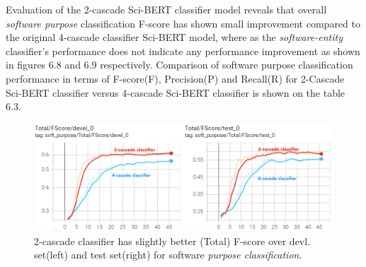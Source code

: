 Evaluation of the 2-cascade Sci-BERT classifier model reveals that overall \emph{software purpose} classification F-score has shown small improvement compared to the original 4-cascade classifier  \ac{Sci-BERT} model, where as the \emph{software-entity} classifier’s performance does not indicate any performance improvement as shown in figures 6.8 and 6.9 respectively. Comparison of software purpose classification performance in terms of F-score(F), Precision(P) and Recall(R) for 2-Cascade Sci-BERT classifier versus 4-cascade Sci-BERT classifier is shown on the table 6.3. \\

\begin{figure}[htbp]
	\centering
	\includegraphics[width=1\textwidth]{4.graphics/figures/ch_6/5.2layerClassifier/HD/4casadeVs2cascade}
	\caption{2-cascade classifier has slightly better (Total) F-score over devl. set(left) and test set(right) for software \emph{purpose classification}.}
	\label{fig:chapter06:with}
\end{figure}

